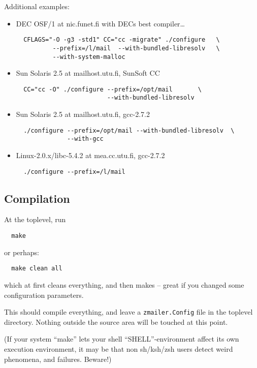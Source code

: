 Additional examples:
\begin{itemize}
\item DEC OSF/1 at nic.funet.fi with DECs best compiler\ldots

\begin{verbatim}
  CFLAGS="-O -g3 -std1" CC="cc -migrate" ./configure   \
          --prefix=/l/mail  --with-bundled-libresolv   \
          --with-system-malloc
\end{verbatim}

\item Sun Solaris 2.5  at mailhost.utu.fi, SunSoft CC

\begin{verbatim}
  CC="cc -O" ./configure --prefix=/opt/mail       \
                         --with-bundled-libresolv
\end{verbatim}

\item Sun Solaris 2.5  at mailhost.utu.fi, gcc-2.7.2

\begin{verbatim}
  ./configure --prefix=/opt/mail --with-bundled-libresolv  \ 
              --with-gcc
\end{verbatim}

\item Linux-2.0.x/libc-5.4.2 at mea.cc.utu.fi, gcc-2.7.2

\begin{verbatim}
  ./configure --prefix=/l/mail
\end{verbatim}
\end{itemize}

\subsection{Compilation}

At the toplevel, run
\begin{verbatim}
  make
\end{verbatim}

or perhaps:
\begin{verbatim}
  make clean all
\end{verbatim}

which at first cleans everything, and then makes -- great if you
changed some configuration parameters.

This should compile everything, and leave a {\tt zmailer.Config} file in
the toplevel directory.  Nothing outside the source area will be
touched at this point.

(If your system ``make'' lets your shell ``SHELL''-environment
affect its own execution environment, it may be that non sh/ksh/zsh
users detect weird phenomena, and failures. Beware!)


